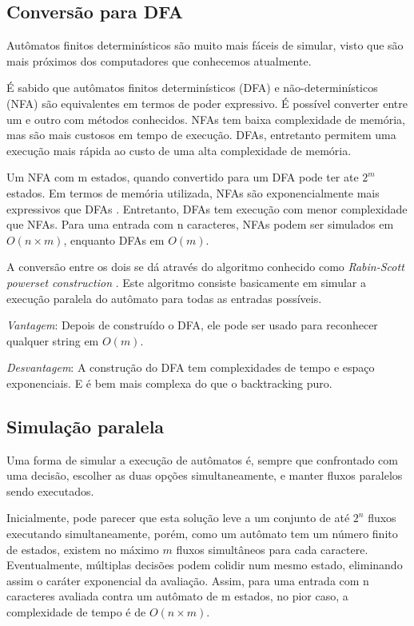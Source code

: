 \documentclass[a4paper,12pt,oneside,onecolumn]{uerj}
\begin{document}
\subsection{Conversão para DFA}

Autômatos finitos determinísticos são muito mais fáceis de simular, visto que são mais próximos dos computadores que conhecemos atualmente. 

É sabido que autômatos finitos determinísticos (DFA) e não-determinísticos (NFA) são equivalentes em termos de poder expressivo. É possível converter entre um e outro com métodos conhecidos. NFAs tem baixa complexidade de memória, mas são mais custosos em tempo de execução. DFAs, entretanto permitem uma execução mais rápida ao custo de uma alta complexidade de memória. 

Um NFA com m estados, quando convertido para um DFA pode ter ate $2^m$ estados. Em termos de memória utilizada, NFAs são exponencialmente mais expressivos que DFAs \cite{bib:Calabro05}. Entretanto, DFAs tem execução com menor complexidade que NFAs. Para uma entrada com n caracteres, NFAs podem ser simulados em $O(n \times m)$, enquanto DFAs em $O(m)$.

A conversão entre os dois se dá através do algoritmo conhecido como \emph{Rabin-Scott powerset construction} \cite{bib:Rabin59}. Este algoritmo consiste basicamente em simular a execução paralela do autômato para todas as entradas possíveis.

\emph{Vantagem}: Depois de construído o DFA, ele pode ser usado para reconhecer qualquer string em $O(m)$.

\emph{Desvantagem}: A construção do DFA tem complexidades de tempo e espaço exponenciais. E é bem mais complexa do que o backtracking puro.

\subsection{Simulação paralela}

Uma forma de simular a execução de autômatos é, sempre que confrontado com uma decisão, escolher as duas opções simultaneamente, e manter fluxos paralelos sendo executados. 

Inicialmente, pode parecer que esta solução leve a um conjunto de até $2^n$ fluxos executando simultaneamente, porém, como um autômato tem um número finito de estados, existem no máximo $m$ fluxos simultâneos para cada caractere. Eventualmente, múltiplas decisões podem colidir num mesmo estado, eliminando assim o caráter exponencial da avaliação. Assim, para uma entrada com n caracteres avaliada contra um autômato de m estados, no pior caso, a complexidade de tempo é de $O(n \times m)$.
\end{document}
